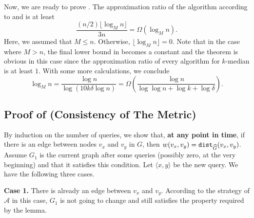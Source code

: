 \documentclass[11pt]{article}
\newcommand{\1}{\mathmybb{1}}
\newcommand{\dist}{\textnormal{\texttt{dist}}}
\newcommand{\adv}[0]{\mathcal{A}}
\begin{document}
\noindent
Now, we are ready to prove .
The approximation ratio of the algorithm according to  and  is at least
$$ \frac{(n/2) \lfloor \log_M n \rfloor}{3n} = \Omega(\log_M n). $$
Here, we assumed that $M \leq n$.
Otherwise, $\lfloor \log_M n \rfloor = 0$. Note that in the case where $M > n$, the final lower bound in  becomes a constant and the theorem is obvious in this case since the approximation ratio of every algorithm for $k$-median is at least $1$.
With some more calculations, we conclude 
$$\log_M n =\frac{\log n}{ \log \left( 10k\delta\log n\right)}  = \Omega \left(\frac{\log n}{ \log \log n + \log k + \log \delta} \right). $$







\subsection{Proof of  (Consistency of The Metric)}\label{sec:consistency-proof}

    By induction on the number of queries, we show that, \textbf{at any point in time}, if there is an edge between nodes $v_x$ and $v_y$ in $G$, then 
    $w(v_x,v_y) = \dist_{\widehat G}(v_x,v_y)$.
    Assume $G_1$ is the current graph after some queries (possibly zero, at the very beginning) and that it satisfies this condition.
    Let $\langle x,y \rangle$ be the new query.
    We have the following three cases.

    \medskip
    \noindent \textbf{Case 1.}
    There is already an edge between $v_x$ and $v_y$.
    According to the strategy of $\adv$ in this case, $G_1$ is not going to change and still satisfies the property required by the lemma.
\end{document}
